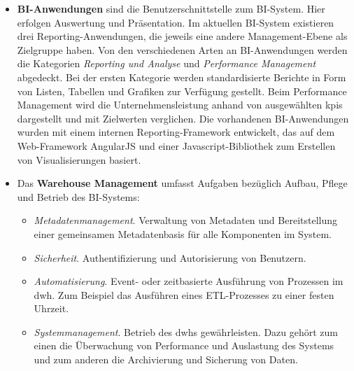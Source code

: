 \begin{itemize}
\item \textbf{BI-Anwendungen} sind die Benutzerschnittstelle zum BI-System. Hier erfolgen Auswertung und Präsentation. Im aktuellen BI-System existieren drei Reporting-Anwendungen, die jeweils eine andere Management-Ebene als Zielgruppe haben. Von den verschiedenen Arten an BI-Anwendungen werden die Kategorien \textit{Reporting und Analyse} und \textit{Performance Management} abgedeckt. Bei der ersten Kategorie werden standardisierte Berichte in Form von Listen, Tabellen und Grafiken zur Verfügung gestellt. Beim {Performance Management} wird die Unternehmensleistung anhand von ausgewählten \acp{kpi} dargestellt und mit Zielwerten verglichen. Die vorhandenen BI-Anwendungen wurden mit einem internen Reporting-Framework entwickelt, das auf dem Web-Framework AngularJS und einer Javascript-Bibliothek zum Erstellen von Visualisierungen basiert.
\item Das \textbf{Warehouse Management} umfasst Aufgaben bezüglich Aufbau, Pflege und Betrieb des BI-Systems:
\begin{itemize}
\item \textit{Metadatenmanagement}. Verwaltung von Metadaten und Bereitstellung einer gemeinsamen Metadatenbasis für alle Komponenten im System.
\item \textit{Sicherheit}. Authentifizierung und Autorisierung von Benutzern.
\item \textit{Automatisierung}. Event- oder zeitbasierte Ausführung von Prozessen im \ac{dwh}. Zum Beispiel das Ausführen eines ETL-Prozesses zu einer festen Uhrzeit.
\item \textit{Systemmanagement}. Betrieb des \ac{dwh}s gewährleisten. Dazu gehört zum einen die Überwachung von Performance und Auslastung des Systems und zum anderen die Archivierung und Sicherung von Daten.
\end{itemize}
\end{itemize}

